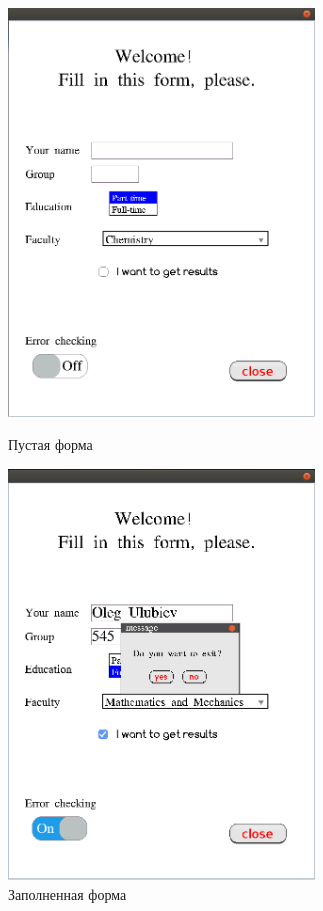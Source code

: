 \documentclass[14pt]{extarticle}
\begin{document}
	\begin{figure}[h]
		\begin{center}
		\begin{minipage}[h]{0.4\linewidth}
		\includegraphics[width=230pt]{pictures/demo11.png}
		\caption{ Пустая форма} %
		\label{emptyform} %
		\end{minipage}
		\hfill 
		\begin{minipage}[h]{0.4\linewidth}
		\includegraphics[width=230pt]{pictures/demo12.png}
		\caption{Заполненная форма}
		\label{filledform}
		\end{minipage}
		\end{center}
		\end{figure}
		
\end{document}
